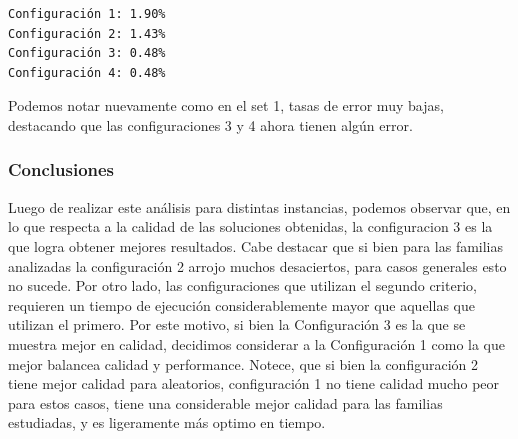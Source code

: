\begin{verbatim}
Configuración 1: 1.90%
Configuración 2: 1.43%
Configuración 3: 0.48%
Configuración 4: 0.48%
\end{verbatim}

Podemos notar nuevamente como en el set 1, tasas de error muy bajas, destacando que las configuraciones 3 y 4 ahora tienen algún error.

\subsubsection{Conclusiones} 

Luego de realizar este análisis para distintas instancias, podemos observar que, en lo que respecta a la calidad de las soluciones obtenidas, la configuracion 3 es la que logra obtener mejores resultados. Cabe destacar que si bien para las familias analizadas la configuración 2 arrojo muchos desaciertos, para casos generales esto no sucede. Por otro lado, las configuraciones que utilizan el segundo criterio, requieren un tiempo de ejecución considerablemente mayor que aquellas que utilizan el primero.  Por este motivo, si bien la Configuración 3 es la que se muestra mejor en calidad, decidimos considerar a la Configuración 1 como la que mejor balancea calidad y performance. Notece, que si bien la configuración 2 tiene mejor calidad para aleatorios, configuración 1 no tiene calidad mucho peor para estos casos, tiene una considerable mejor calidad para las familias estudiadas, y es ligeramente más optimo en tiempo.